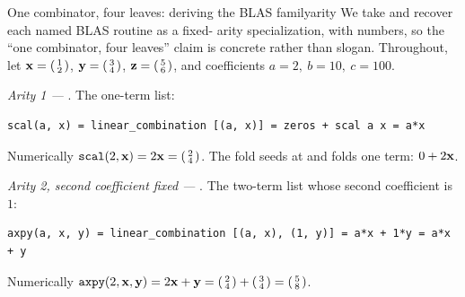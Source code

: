 \begin{workedexample}{One combinator, four leaves: deriving the BLAS family}{arity}
We take  and recover each named BLAS routine as a fixed-
arity specialization, with numbers, so the ``one combinator, four leaves'' claim is
concrete rather than slogan. Throughout, let
$\mathbf{x} = \begin{psmallmatrix}1\\2\end{psmallmatrix}$,
$\mathbf{y} = \begin{psmallmatrix}3\\4\end{psmallmatrix}$,
$\mathbf{z} = \begin{psmallmatrix}5\\6\end{psmallmatrix}$, and coefficients
$a = 2,\ b = 10,\ c = 100$.

\emph{Arity 1 ---} . The one-term list:
\begin{lstlisting}[style=l4style]
scal(a, x) = linear_combination [(a, x)] = zeros + scal a x = a*x
\end{lstlisting}
Numerically $\texttt{scal}(2, \mathbf{x}) = 2\mathbf{x} = \begin{psmallmatrix}2\\4\end{psmallmatrix}$.
The fold seeds at  and folds one term: $0 + 2\mathbf{x}$.

\emph{Arity 2, second coefficient fixed ---} . The two-term list whose
second coefficient is $1$:
\begin{lstlisting}[style=l4style]
axpy(a, x, y) = linear_combination [(a, x), (1, y)] = a*x + 1*y = a*x + y
\end{lstlisting}
Numerically $\texttt{axpy}(2, \mathbf{x}, \mathbf{y}) = 2\mathbf{x} + \mathbf{y} =
\begin{psmallmatrix}2\\4\end{psmallmatrix} + \begin{psmallmatrix}3\\4\end{psmallmatrix}
= \begin{psmallmatrix}5\\8\end{psmallmatrix}$.


\end{workedexample}
